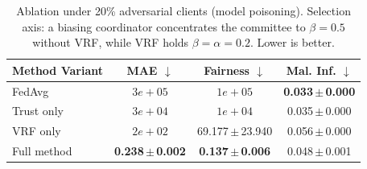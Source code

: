 \begin{table}[t]
\centering
\caption{Ablation under 20\% adversarial clients (model poisoning). Selection axis: a biasing coordinator concentrates the committee to $\beta=0.5$ without VRF, while VRF holds $\beta=\alpha=0.2$. Lower is better.}
\label{tab:ablation}
\scriptsize
\begin{tabular}{lccc}
\toprule
\textbf{Method Variant} & \textbf{MAE $\downarrow$} & \textbf{Fairness $\downarrow$} & \textbf{Mal. Inf. $\downarrow$} \\
\midrule
FedAvg & $3e+05$ & $1e+05$ & \textbf{0.033\,$\pm$\,0.000} \\
Trust only & $3e+04$ & $1e+04$ & 0.035\,$\pm$\,0.000 \\
VRF only & $2e+02$ & 69.177\,$\pm$\,23.940 & 0.056\,$\pm$\,0.000 \\
Full method & \textbf{0.238\,$\pm$\,0.002} & \textbf{0.137\,$\pm$\,0.006} & 0.048\,$\pm$\,0.001 \\
\bottomrule
\end{tabular}
\end{table}
